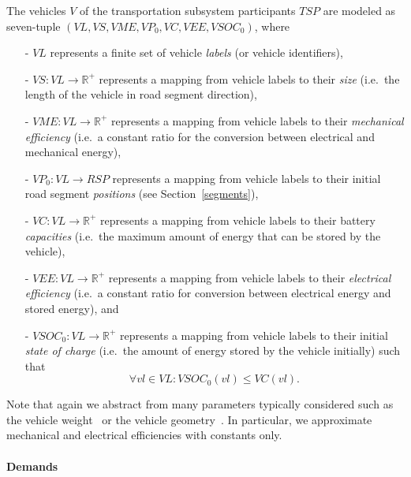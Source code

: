 The vehicles $V$ of the transportation subsystem participants $TSP$ are modeled as seven-tuple $(VL, VS, VME, VP_0, VC, VEE, VSOC_0)$, where
\begin{itemize}
	\item[-] $VL$ represents a finite set of vehicle \textit{labels} (or vehicle identifiers),
	\item[-] $VS: VL \rightarrow \mathbb{R}^+$ represents a mapping from vehicle labels to their \textit{size} (i.e.\ the length of the vehicle in road segment direction),
	\item[-] $VME: VL \rightarrow \mathbb{R}^+$ represents a mapping from vehicle labels to their \textit{mechanical efficiency} (i.e.\ a constant ratio for the conversion between electrical and mechanical energy),
	\item[-] $VP_0: VL \rightarrow RSP$ represents a mapping from vehicle labels to their initial road segment \textit{positions} (see Section~\ref{segments}),
	\item[-] $VC: VL \rightarrow \mathbb{R}^+$ represents a mapping from vehicle labels to their battery \textit{capacities} (i.e.\ the maximum amount of energy that can be stored by the vehicle),
	\item[-] $VEE: VL \rightarrow \mathbb{R}^+$ represents a mapping from vehicle labels to their \textit{electrical efficiency} (i.e.\ a constant ratio for conversion between electrical energy and stored energy), and
	\item[-] $VSOC_0: VL \rightarrow \mathbb{R}^+$ represents a mapping from vehicle labels to their initial \textit{state of charge} (i.e.\ the amount of energy stored by the vehicle initially) such that
	\[
		\forall vl \in VL : VSOC_0(vl) \leq VC(vl) \textrm{.}
	\]
\end{itemize}
Note that again we abstract from many parameters typically considered such as the vehicle weight~\cite{?} or the vehicle geometry~\cite{?}. In particular, we approximate mechanical and electrical efficiencies with constants only.

\paragraph{Demands}
\label{demands}

